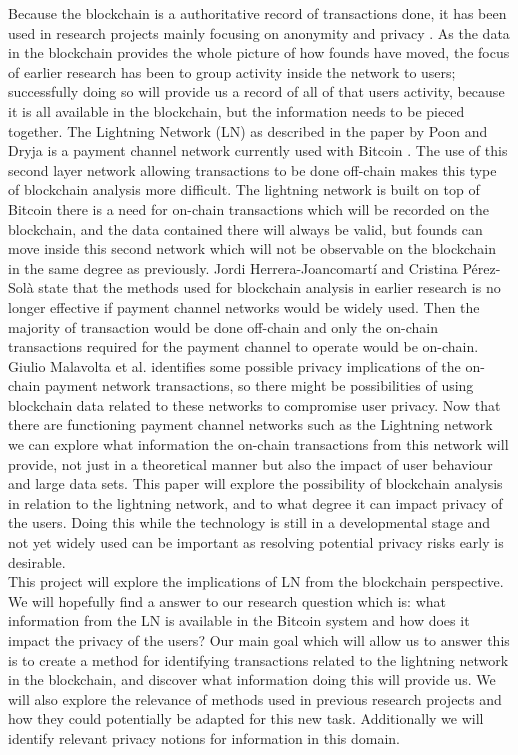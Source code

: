 Because the blockchain is a authoritative record of transactions done, it has been used in research projects mainly focusing on anonymity and privacy \cite{reid2013analysis} \cite{meiklejohn2013fistful}. As the data in the blockchain provides the whole picture of how founds have moved, the focus of earlier research has been to group activity inside the network to users; successfully doing so will provide us a record of all of that users activity, because it is all available in the blockchain, but the information needs to be pieced together.
The Lightning Network (LN) as described in the paper by Poon and Dryja \cite{poon2015bitcoin} is a payment channel network currently used with Bitcoin . The use of this second layer network allowing transactions to be done off-chain makes this type of blockchain analysis more difficult. The lightning network is built on top of Bitcoin there is a need for on-chain transactions which will be recorded on the blockchain, and the data contained there will always be valid, but founds can move inside this second network which will not be observable on the blockchain in the same degree as previously. Jordi Herrera-Joancomartí and Cristina Pérez-Solà \cite{herrera2015research} state that the methods used for blockchain analysis in earlier research is no longer effective if payment channel networks would be widely used. Then the majority of transaction would be done off-chain and only the on-chain transactions required for the payment channel to operate would be on-chain. Giulio Malavolta et al. \cite{malavolta2017concurrency} identifies some possible privacy implications of the on-chain payment network transactions, so there might be possibilities of using blockchain data related to these networks to compromise user privacy. Now that there are functioning payment channel networks such as the Lightning network we can explore what information the on-chain transactions from this network will provide, not just in a theoretical manner but also the impact of user behaviour and large data sets. This paper will explore the possibility of blockchain analysis in relation to the lightning network, and to what degree it can impact privacy of the users. Doing this while the technology is still in a developmental stage and not yet widely used can be important as resolving potential privacy risks early is desirable.
\\

This project will explore the implications of LN from the blockchain perspective.
We will hopefully find a answer to our research question which is: what information from the LN is available in the Bitcoin system and how does it impact the privacy of the users?
Our main goal which will allow us to answer this is to create a method for identifying transactions related to the lightning network in the blockchain, and discover what information doing this will provide us.
We will also explore the relevance of methods used in previous research projects and how they could potentially be adapted for this new task. Additionally we will identify relevant privacy notions for information in this domain.

